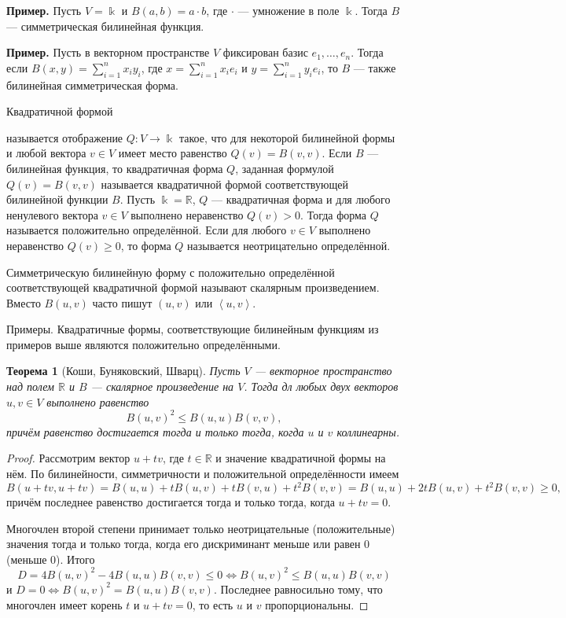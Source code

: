 \documentclass[12pt]{article}
\newtheorem{theorem}{Теорема}
\numberwithin{theorem}{section}
\theoremstyle{definition}
\newenvironment{example}{\indent \textbf{Пример.}}{\indent}
\newcommand{\RR}{\mathbb{R}}
\newcommand{\defin}[2]{\hypertarget{#2}{{\color{red} #1}}}
\begin{document}
	\begin{example}
		Пусть $ V = \Bbbk $ и $ B(a, b) = a \cdot b $, где $ \cdot $ --- умножение в поле $ \Bbbk $.
		Тогда $ B $ --- симметрическая билинейная функция.
	\end{example}
	
	\begin{example}
		Пусть в векторном пространстве $ V $
		фиксирован базис $ e_1, \ldots, e_n $. Тогда если $ B(x, y) = \sum\limits_{i = 1}^{n} x_iy_i $, где $ x = \sum\limits_{i = 1}^{n} x_ie_i $ и $ y = \sum\limits_{i = 1}^{n} y_ie_i $, то $ B $ --- также билинейная симметрическая форма.
	\end{example}
	
	\defin{Квадратичной формой}{quadratic} называется отображение $ Q \colon V \to \Bbbk $ такое, что для некоторой билинейной формы и любой вектора $ v \in V $ имеет место равенство $ Q(v) = B(v, v) $.
	Если $ B $ --- билинейная функция, то квадратичная форма $ Q $, заданная формулой $ Q(v) = B(v, v) $
	называется квадратичной формой соответствующей билинейной функции $ B $.
	Пусть $ \Bbbk = \RR $, $ Q $ --- квадратичная форма 
	и для любого ненулевого вектора $ v \in V $ выполнено неравенство $ Q(v) > 0 $.
	Тогда форма $ Q $ называется положительно определённой. 
	Если для любого $ v \in V $ выполнено неравенство $ Q(v) \geqslant 0 $,
	то форма $ Q $ называется неотрицательно определённой.

	Симметрическую билинейную форму с положительно определённой соответствующей квадратичной формой называют 
	\defin{скалярным произведением}{inner-product}. Вместо $ B(u,v) $ часто пишут $ (u, v) $ или $ \left<u, v\right> $.
	
	Примеры. Квадратичные формы, соответствующие билинейным функциям из примеров выше являются положительно определёнными.
	
	\begin{theorem}[Коши, Буняковский, Шварц] \label{Cauchy-real}
		Пусть $ V $ --- векторное пространство над полем $ \RR $ и $ B $ --- скалярное произведение на $ V $.
		Тогда дл любых двух векторов $ u, v \in V $ выполнено равенство
		$$ B(u, v)^2 \leqslant B(u,u)B(v,v), $$
		причём равенство достигается тогда и только тогда, когда $ u $ и $ v $ коллинеарны.
	\end{theorem}
	
	\begin{proof}
		Рассмотрим вектор $ u + tv $, где $ t \in \RR $ и значение квадратичной формы на нём.
		По билинейности, симметричности и положительной определённости имеем 
		$$ B(u + tv, u + tv) = B(u, u) + tB(u, v) + tB(v, u) + t^2B(v,v) = B(u,u) + 2tB(u,v) + t^2B(v,v) \geqslant 0, $$
		причём последнее равенство достигается тогда и только тогда, когда $ u + tv = 0 $.
		
		Многочлен второй степени принимает только неотрицательные (положительные) значения тогда и только тогда, когда его дискриминант меньше или равен 0 (меньше 0).
		Итого $$ D = 4B(u,v)^2 - 4B(u,u)B(v,v) \leqslant 0  \Leftrightarrow B(u,v)^2 \leqslant B(u,u)B(v,v) $$
		и $ D = 0 \Leftrightarrow B(u,v)^2 = B(u,u)B(v,v) $. Последнее равносильно тому, что многочлен имеет корень $ t $
		и $ u + tv = 0 $, то есть $ u $ и $ v $ пропорциональны.
	\end{proof}
	
\end{document}
